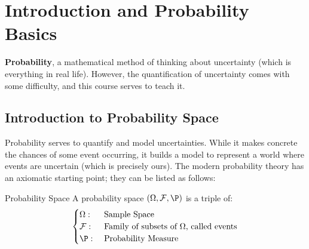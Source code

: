 \chapter{Introduction and Probability Basics}
\textbf{Probability}, a mathematical method of thinking about uncertainty (which is everything in real life).
However, the quantification of uncertainty comes with some difficulty, and this course serves to teach it.

\section{Introduction to Probability Space}
Probability serves to quantify and model uncertainties. While it makes concrete the chances of some event occurring, it builds a model to represent a world where events are uncertain (which is precisely ours).
The modern probability theory has an axiomatic starting point; they can be listed as follows:

\begin{ln-define}{Probability Space}{}
    A probability space $(\Omega, \mathcal{F}, \P)$ is a triple of:
    \[
        \begin{cases}
            \Omega: &\text{ Sample Space} \\
            \mathcal{F}: &\text{ Family of subsets of $\Omega$, called events} \\
            \P: &\text{ Probability Measure}
        \end{cases}
    \]
\end{ln-define}

